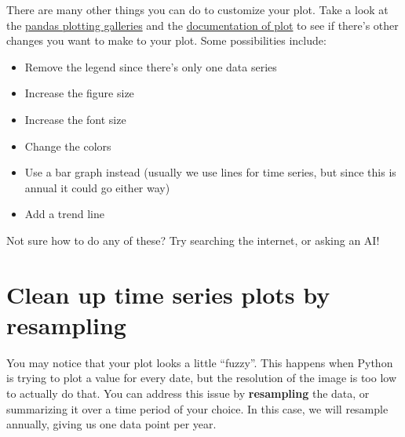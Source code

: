 \documentclass[
  letterpaper,
  DIV=11,
  numbers=noendperiod,
  oneside]{scrreprt}
\providecommand{\tightlist}{%
  \setlength{\itemsep}{0pt}\setlength{\parskip}{0pt}}
\begin{document}
\begin{tcolorbox}[enhanced jigsaw, colbacktitle=quarto-callout-color!10!white, opacityback=0, bottomtitle=1mm, toptitle=1mm, bottomrule=.15mm, left=2mm, colframe=quarto-callout-color-frame, leftrule=.75mm, opacitybacktitle=0.6, colback=white, rightrule=.15mm, toprule=.15mm, breakable, titlerule=0mm, title=\textcolor{quarto-callout-color}{\faInfo}\hspace{0.5em}{Looking for an Extra Challenge?}, coltitle=black, arc=.35mm]

There are many other things you can do to customize your plot. Take a
look at the
\href{https://pandas.pydata.org/docs/user_guide/visualization.html}{pandas
plotting galleries} and the
\href{https://pandas.pydata.org/docs/reference/api/pandas.DataFrame.plot.html}{documentation
of plot} to see if there's other changes you want to make to your plot.
Some possibilities include:

\begin{itemize}
\tightlist
\item
  Remove the legend since there's only one data series
\item
  Increase the figure size
\item
  Increase the font size
\item
  Change the colors
\item
  Use a bar graph instead (usually we use lines for time series, but
  since this is annual it could go either way)
\item
  Add a trend line
\end{itemize}

Not sure how to do any of these? Try searching the internet, or asking
an AI!

\end{tcolorbox}

\section{Clean up time series plots by
resampling}\label{clean-up-time-series-plots-by-resampling-1}

You may notice that your plot looks a little ``fuzzy''. This happens
when Python is trying to plot a value for every date, but the resolution
of the image is too low to actually do that. You can address this issue
by \textbf{resampling} the data, or summarizing it over a time period of
your choice. In this case, we will resample annually, giving us one data
point per year.
\end{document}
